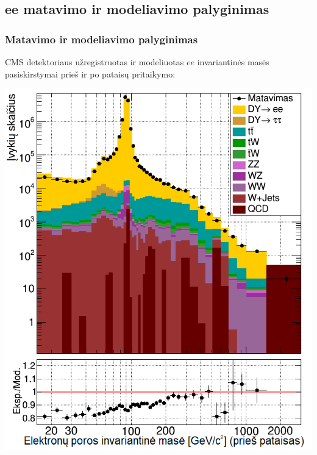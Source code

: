 \documentclass[xcolor=dvipsnames]{beamer}
\newcommand{\ee}{\mathit{ee}}
\begin{document}
\begin{frame}
	\section{ee matavimo ir modeliavimo palyginimas}
	\frametitle{Matavimo ir modeliavimo palyginimas}
	CMS detektoriaus užregistruotas ir modeliuotas $\ee$ invariantinės masės pasiskirstymai prieš ir po pataisų pritaikymo:
	\begin{minipage}{0.49\textwidth}
		\includegraphics[width=\linewidth]{eeMassBefore_SMALL.png}
	\end{minipage}
	\hfill
	\begin{minipage}{0.49\textwidth}

\end{minipage}
\end{frame}
\end{document}

